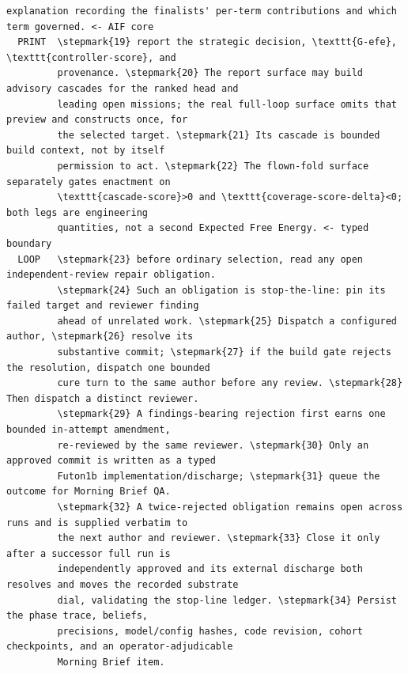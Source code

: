 \begin{Verbatim}[fontsize=\footnotesize,commandchars=\\\{\}]
         explanation recording the finalists' per-term contributions and which term governed. <- AIF core
  PRINT  \stepmark{19} report the strategic decision, \texttt{G-efe}, \texttt{controller-score}, and
         provenance. \stepmark{20} The report surface may build advisory cascades for the ranked head and
         leading open missions; the real full-loop surface omits that preview and constructs once, for
         the selected target. \stepmark{21} Its cascade is bounded build context, not by itself
         permission to act. \stepmark{22} The flown-fold surface separately gates enactment on
         \texttt{cascade-score}>0 and \texttt{coverage-score-delta}<0; both legs are engineering
         quantities, not a second Expected Free Energy. <- typed boundary
  LOOP   \stepmark{23} before ordinary selection, read any open independent-review repair obligation.
         \stepmark{24} Such an obligation is stop-the-line: pin its failed target and reviewer finding
         ahead of unrelated work. \stepmark{25} Dispatch a configured author, \stepmark{26} resolve its
         substantive commit; \stepmark{27} if the build gate rejects the resolution, dispatch one bounded
         cure turn to the same author before any review. \stepmark{28} Then dispatch a distinct reviewer.
         \stepmark{29} A findings-bearing rejection first earns one bounded in-attempt amendment,
         re-reviewed by the same reviewer. \stepmark{30} Only an approved commit is written as a typed
         Futon1b implementation/discharge; \stepmark{31} queue the outcome for Morning Brief QA.
         \stepmark{32} A twice-rejected obligation remains open across runs and is supplied verbatim to
         the next author and reviewer. \stepmark{33} Close it only after a successor full run is
         independently approved and its external discharge both resolves and moves the recorded substrate
         dial, validating the stop-line ledger. \stepmark{34} Persist the phase trace, beliefs,
         precisions, model/config hashes, code revision, cohort checkpoints, and an operator-adjudicable
         Morning Brief item.
\end{Verbatim}

\FloatBarrier


